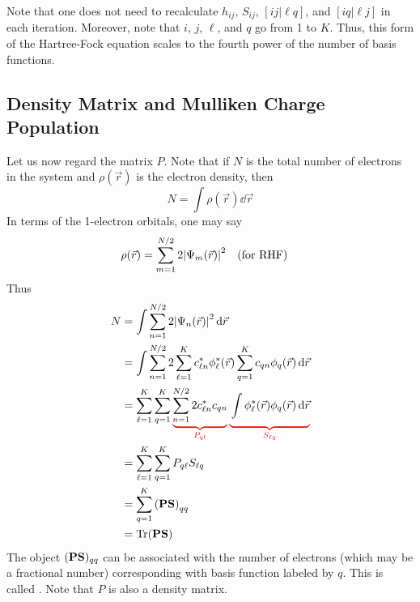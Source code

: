 \documentclass[12pt,a4paper,titlepage]{article}
\newcommand{\ul}[1]{\underline{\smash{#1}}} %
\begin{document}

\newpage
Note that one does not need to recalculate $h_{ij}$, $S_{ij}$, $[ij|\ell q]$, and $[iq|\ell j]$ in each iteration. Moreover, note that $i$, $j$, $\ell$, and $q$ go from 1 to $K$. Thus, this form of the Hartree-Fock equation scales to the fourth power of the number of basis functions.

\subsection{Density Matrix and Mulliken Charge Population}
Let us now regard the matrix $P$. Note that if $N$ is the total number of electrons in the system and $\rho(\vec{r})$ is the electron density, then
\begin{equation}
N=\int\rho(\vec{r})\dd{\vec{r}}
\end{equation}
In terms of the 1-electron orbitals, one may say
\begin{equation}
\rho(\vec{r})=\sum_{m=1}^{N/2}2\abs{\Psi_{m}(\vec{r})}^{2}\qq{(for RHF)}
\end{equation}
Thus
\begin{equation}
\begin{aligned}
N&=\int\sum_{n=1}^{N/2}2\abs{\Psi_{n}(\vec{r})}^{2}\dd{\vec{r}}\\
&=\int\sum_{n=1}^{N/2}2\sum_{\ell=1}^{K}c_{\ell n}^{*}\phi_{\ell}^{*}(\vec{r})\sum_{q=1}^{K}c_{qn}\phi_{q}(\vec{r})\dd{\vec{r}}\\
&=\sum_{\ell=1}^{K}\sum_{q=1}^{K}{\color{red}\underbrace{\color{black}\sum_{n=1}^{N/2}2c_{\ell n}^{*}c_{qn}}_{P_{ql}}}\,{\color{red}\underbrace{\vphantom{\sum_{n=1}^{N/2}}\color{black}\int\phi_{\ell}^{*}(\vec{r})\phi_{q}(\vec{r})\dd{\vec{r}}}_{S_{\ell q}}}\\
&=\sum_{\ell=1}^{K}\sum_{q=1}^{K}P_{q\ell}S_{\ell q}\\
&=\sum_{q=1}^{K}\qty(\vb{P}\vb{S})_{qq}\\
&=\Tr(\vb{PS})
\end{aligned}
\end{equation}
The object $(\vb{PS})_{qq}$ can be associated with the number of electrons (which may be a fractional number) corresponding with basis function labeled by $q$. This is called \ul{Mullikan population}. Note that $P$ is also a density matrix.
\end{document}
